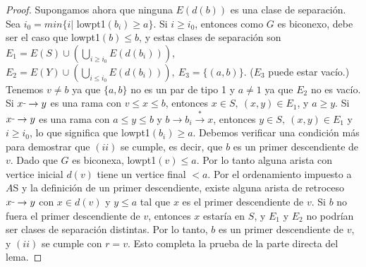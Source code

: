 \begin{proof}
Supongamos ahora que ninguna $E\left(d\left(b\right)\right)$ es una clase de separación. Sea $i_{0} = min\{i | $ lowpt1$\left(b_{i}\right) \geq a\}$. Si $i \geq i_{0}$, entonces como $G$ es biconexo, debe ser el caso que lowpt1$\left(b\right) \le b$, y estas clases de separación son $E_{1} = E\left(S\right) \cup \left(\bigcup_{i \geq i_{0}}E\left(d\left(b_{i}\right)\right)\right)$,\\ $E_{2} = E\left(Y\right) \cup \left(\bigcup_{i \le i_{0}} E\left(d\left(b_{i}\right)\right)\right),~ E_{3} = \{(a, b)\}$. ($E_{3}$ puede estar vacío.) Tenemos $v \neq b$ ya que $\{a, b\}$ no es un par de tipo 1 y $a \neq 1$ ya que $E_{2}$ no es vacío. Si $x \rule[1mm]{.1cm}{0.4pt} \rightarrow y$ es una rama con $v \leq x \le b$, entonces $x \in S,~ \left(x, y\right) \in E_{1}$, y $a \geq y$. Si $x \rule[1mm]{.1cm}{0.4pt} \rightarrow y$ es una rama con $a \le y \le b$ y $b \rightarrow b_{i} \overset{\ast}{\rightarrow} x$, entonces $y \in S,~ \left(x,y\right) \in E_{1}$ y $ i \geq i_{0}$, lo que significa que lowpt1$\left(b_{i}\right) \geq a$. Debemos verificar una condición más para demostrar que $\left(ii\right)$ se cumple, es decir, que $b$ es un primer descendiente de $v$. Dado que $G$ es biconexa, lowpt1$\left(v\right) \le a$. Por lo tanto alguna arista con vertice inicial $d\left(v\right)$ tiene un vertice final $ < a$. Por el ordenamiento impuesto a $A$S y la definición de un primer descendiente, existe alguna arista de retroceso $x \rule[1mm]{.1cm}{0.4pt} \rightarrow y$ con $x \in d\left(v\right)$ y $y \le a$ tal que $x$ es el primer descendiente de $v$. Si $b$ no fuera el primer descendiente de $v$, entonces $x$ estaría en $S$, y $E_{1}$ y $E_{2}$ no podrían ser clases de separación distintas. Por lo tanto, $b$ es un primer descendiente de $v$, y $\left(ii\right)$ se cumple con $r = v$. Esto completa la prueba de la parte directa del lema.
\end{proof}

